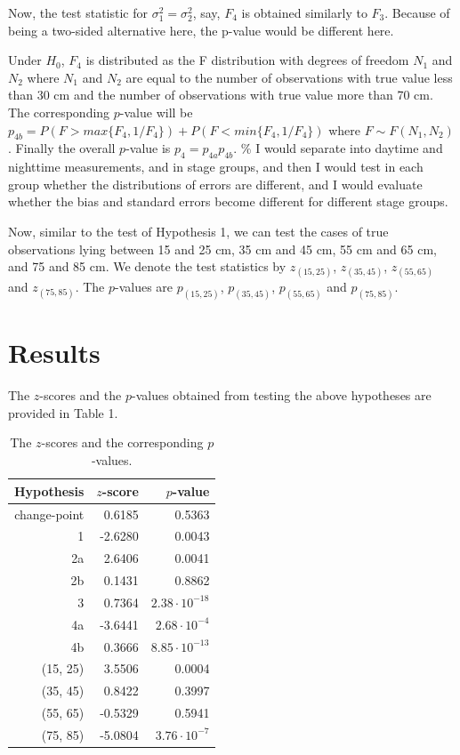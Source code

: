 \documentclass[]{article}
\begin{document}
Now, the test statistic for \(\sigma_1^2 = \sigma_2^2\), say, \(F_4\) is obtained similarly to \(F_3\). Because of being a two-sided alternative here, the p-value would be different here.

Under \(H_0\), \(F_4\) is distributed as the F distribution with degrees of freedom \(N_1\) and \(N_2\) where \(N_1\) and \(N_2\) are equal to the number of observations with true value less than 30 cm and the number of observations with true value more than 70 cm. The corresponding \(p\)-value will be \(p_{4b} = P(F > max{\lbrace F_4, 1 / F_4 \rbrace}) + P(F < min{\lbrace F_4, 1 / F_4 \rbrace})\) where \(F \sim F(N_1, N_2)\). Finally the overall \(p\)-value is \(p_4 = p_{4a} p_{4b}\).
\% I would separate into daytime and nighttime measurements, and in stage groups, and then I would test in each group whether the distributions of errors are different, and I would evaluate whether the bias and standard errors become different for different stage groups.

Now, similar to the test of Hypothesis 1, we can test the cases of true observations lying between 15 and 25 cm, 35 cm and 45 cm, 55 cm and 65 cm, and 75 and 85 cm. We denote the test statistics by \(z_{(15,25)}\), \(z_{(35, 45)}\), \(z_{(55, 65)}\) and \(z_{(75, 85)}\). The \(p\)-values are \(p_{(15,25)}\), \(p_{(35, 45)}\), \(p_{(55, 65)}\) and \(p_{(75, 85)}\).

\section{Results}

The \(z\)-scores and the \(p\)-values obtained from testing the above hypotheses are provided in Table 1.

\begin{table}[ht]
\centering
\begin{tabular}{rrr}
  \hline
Hypothesis & $z$-score & $p$-value \\ 
  \hline
change-point & 0.6185 & 0.5363 \\ 
  1 & -2.6280 & 0.0043 \\ 
  2a & 2.6406 & 0.0041 \\ 
  2b & 0.1431 & 0.8862 \\ 
  3 & 0.7364 & $2.38 \cdot 10^{-18}$ \\ 
  4a & -3.6441 & $2.68 \cdot 10^{-4}$ \\ 
  4b & 0.3666 & $8.85 \cdot 10^{-13}$ \\ 
  (15, 25) & 3.5506 & 0.0004 \\ 
  (35, 45) & 0.8422 & 0.3997 \\ 
  (55, 65) & -0.5329 & 0.5941 \\ 
  (75, 85) & -5.0804 & $3.76 \cdot 10^{-7}$ \\ 
   \hline
\end{tabular}
\caption{The $z$-scores and the corresponding $p$-values.}
\end{table}
\end{document}
